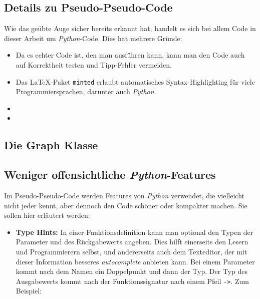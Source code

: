 \documentclass[../main.tex]{subfiles}
\begin{document}
\begin{appendices}

\chapter{Details zu Pseudo-Pseudo-Code}
\label{appendix:code}

Wie das geübte Auge sicher bereits erkannt hat, handelt es sich bei allem Code in dieser Arbeit um \emph{Python}-Code. Dies hat mehrere Gründe:
\begin{itemize}
    \item Da es echter Code ist, den man ausführen kann, kann man den Code auch auf Korrektheit testen und Tipp-Fehler vermeiden.
    \item Das \LaTeX-Paket \verb|minted| erlaubt automatisches Syntax-Highlighting für viele Programmiersprachen, darunter auch \emph{Python}.
    \item {}
    \item {}
\end{itemize}

\section{Die Graph Klasse}

\section{Weniger offensichtliche \emph{Python}-Features}

Im Pseudo-Pseudo-Code werden Features von \emph{Python} verwendet, die vielleicht nicht jeder kennt, aber dennoch den Code schöner oder kompakter machen. Sie sollen hier erläutert werden:

\begin{itemize}
    \item \textbf{Type Hints:} In einer Funktionsdefinition kann man optional den Typen der Parameter und des Rückgabewerts angeben. Dies hilft einerseits den Lesern und Programmierern selbst, und andererseits auch dem Texteditor, der mit dieser Information besseres \emph{autocomplete} anbieten kann. Bei einem Parameter kommt nach dem Namen ein Doppelpunkt und dann der Typ. Der Typ des Ausgabewerts kommt nach der Funktionssignatur nach einem Pfeil \verb|->|. Zum Beispiel:
    

\end{itemize}
\end{appendices}
\end{document}
